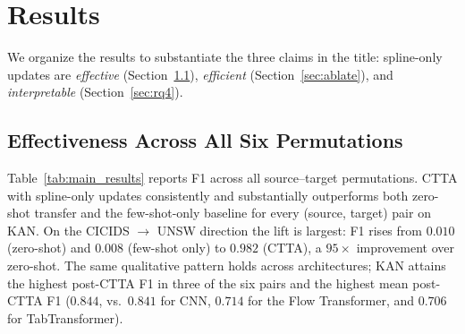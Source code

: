 \documentclass[10pt, conference, letterpaper]{IEEEtran}
\begin{document}
\section{Results}
\label{sec:results}

We organize the results to substantiate the three claims in the title: spline-only updates are \emph{effective} (Section~\ref{sec:eff}), \emph{efficient} (Section~\ref{sec:ablate}), and \emph{interpretable} (Section~\ref{sec:rq4}).

\subsection{Effectiveness Across All Six Permutations}
\label{sec:eff}

Table~\ref{tab:main_results} reports F1 across all source--target permutations. CTTA with spline-only updates consistently and substantially outperforms both zero-shot transfer and the few-shot-only baseline for every (source, target) pair on KAN. On the CICIDS $\to$ UNSW direction the lift is largest: F1 rises from $0.010$ (zero-shot) and $0.008$ (few-shot only) to $0.982$ (CTTA), a $95\times$ improvement over zero-shot. The same qualitative pattern holds across architectures; KAN attains the highest post-CTTA F1 in three of the six pairs and the highest mean post-CTTA F1 ($0.844$, vs.\ $0.841$ for CNN, $0.714$ for the Flow Transformer, and $0.706$ for TabTransformer).
\end{document}
